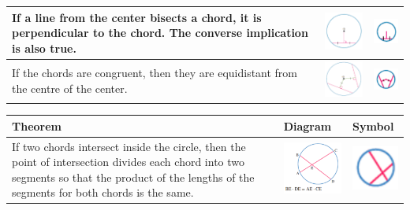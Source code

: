 \documentclass[a4paper,10pt]{report}
\begin{document}
\begin{center}
\begin{tabular}[center]{|p{5cm}|p{3cm}|p{2cm}|}
		If a line from the center bisects a chord, it is perpendicular to the chord.  The converse implication is also true. & \includegraphics[width=3cm]{circle theorem 4} & \includegraphics[width=2cm]{circle theorem 4 symbol} \\ \hline
		If the chords are congruent, then they are equidistant from the centre of the center.                                & \includegraphics[width=3cm]{circle theorem 5} & \includegraphics[width=2cm]{circle theorem 5 symbol} \\ \hline
	\end{tabular}
	\begin{tabular}[center]{|p{5cm}|p{3cm}|p{2cm}|}
		\hline
		Theorem                                                                                                                                                                                        & Diagram                                        & Symbol                                                \\ \hline
		If two chords intersect inside the circle, then the point of intersection divides each chord into two segments so that the product of the lengths of the segments for both chords is the same. & \includegraphics[width=3cm]{circle theorem 6}  & \includegraphics[width=2cm]{circle theorem 6 symbol}  \\ \hline

\end{tabular}
\end{center}
\end{document}
